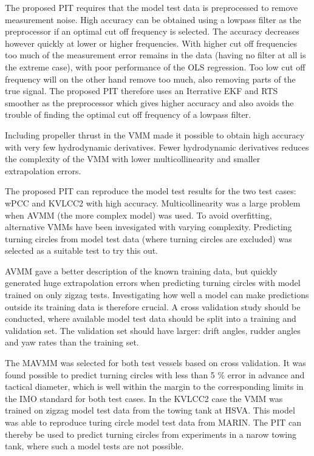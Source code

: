 \documentclass[review]{elsarticle}
\begin{document}
\sphinxAtStartPar
The proposed PIT requires that the model test data is preprocessed to remove measurement noise. High accuracy can be obtained using a low\sphinxhyphen{}pass filter as the preprocessor if an optimal cut off frequency is selected. The accuracy decreases however quickly at lower or higher frequencies. With higher cut off frequencies too much of the measurement error remains in the data (having no filter at all is the extreme case), with poor performance of the OLS regression. Too low cut off frequency will on the other hand remove too much, also removing parts of the true signal. The proposed PIT therefore uses an Iterrative EKF and RTS smoother as the preprocessor which gives higher accuracy and also avoids the trouble of finding the optimal cut off frequency of a low\sphinxhyphen{}pass filter.

\sphinxAtStartPar
Including propeller thrust in the VMM made it possible to obtain high accuracy with very few hydrodynamic derivatives. Fewer hydrodynamic derivatives reduces the complexity of the VMM with lower multicollinearity and smaller extrapolation errors.

\sphinxAtStartPar
The proposed PIT can reproduce the model test results for the two test cases: wPCC and KVLCC2 with high accuracy. Multicollinearity was a large problem when AVMM (the more complex model) was used. To avoid overfitting, alternative VMMs have been invesigated with varying complexity. Predicting turning circles from model test data (where turning circles are excluded) was selected as a suitable test to try this out.

\sphinxAtStartPar
AVMM gave a better description of the known training data, but quickly generated huge extrapolation errors when predicting turning circles with model trained on only zigzag tests. Investigating how well a model can make predictions outside its training data is therefore crucial. A cross validation study should be conducted, where available model test data should be split into a training and validation set. The validation set should have larger: drift angles, rudder angles and yaw rates than the training set.

\sphinxAtStartPar
The MAVMM was selected for both test vessels based on cross validation. It was found possible to predict turning circles with less than 5 \% error in advance and tactical diameter, which is well within the margin to the corresponding limits in the IMO standard for both test cases. In the KVLCC2 case the VMM was trained on zigzag model test data from the towing tank at HSVA. This model was able to reproduce turing circle model test data from MARIN. The PIT can thereby be used to predict turning circles from experiments in a narow towing tank, where such a model tests are not possible.
\end{document}
